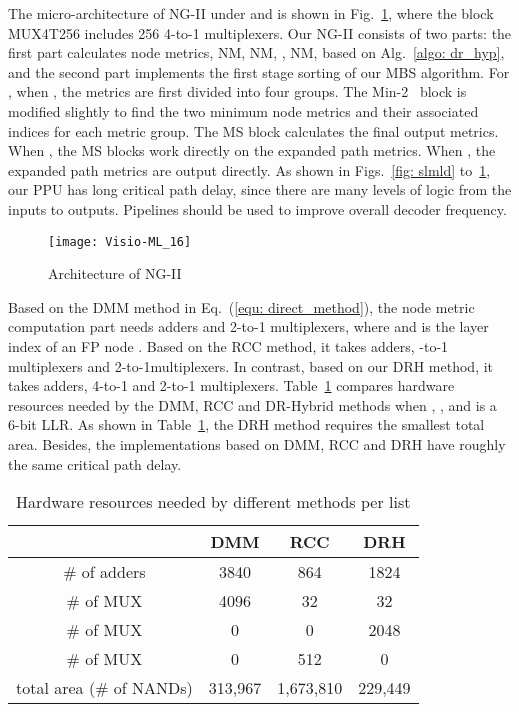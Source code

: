 \documentclass[journal]{IEEEtran}
\begin{document}
The micro-architecture of NG-II under  and  is shown in Fig.~\ref{fig:ML16}, where the block MUX4T256 includes 256 4-to-1 multiplexers. Our NG-II consists of two parts: the first part calculates  node metrics, NM, NM, , NM, based on Alg.~\ref{algo: dr_hyp}, and the second part implements the first stage sorting of our MBS algorithm. For , when , the  metrics are first divided into four groups. The Min-2~\cite{min2} block is modified slightly to find the two minimum node metrics and their associated indices for each metric group. The MS block calculates the final output metrics. When , the MS blocks work directly on the  expanded path metrics. When , the expanded path metrics are output directly. As shown in Figs.~\ref{fig: slmld} to~\ref{fig:ML16}, our PPU has long critical path delay, since there are many levels of logic from the inputs to outputs. Pipelines should be used to improve overall decoder frequency.

\begin{figure}[htbp]
\centering
\texttt{[image: Visio-ML\_16]}
\caption{Architecture of NG-II}\label{fig:ML16}
\end{figure}

Based on the DMM method in Eq.~(\ref{equ: direct_method}), the node metric computation part needs  adders and  2-to-1 multiplexers, where  and  is the layer index of an FP node . Based on the RCC method, it takes  adders,  -to-1 multiplexers and  2-to-1multiplexers.
In contrast, based on our DRH method, it takes  adders,  4-to-1 and  2-to-1 multiplexers. Table~\ref{tab:ML_16} compares hardware resources needed by the DMM, RCC and DR-Hybrid methods when , , and  is a 6-bit LLR. As shown in Table~\ref{tab:ML_16}, the DRH method requires the smallest total area. Besides, the implementations based on DMM, RCC and DRH have roughly the same critical path delay.

\begin{table}[htbp]
\begin{center}
\caption{Hardware resources needed by different methods per list}
\label{tab:ML_16}
\begin{tabular}{|c|c|c|c|}
\hline
& DMM & RCC & DRH \\ \hline
\# of adders & 3840 & 864 & 1824 \\ \hline
\# of MUX & 4096 & 32 & 32 \\ \hline
\# of MUX & 0 & 0 & 2048 \\ \hline
\# of MUX & 0 & 512 & 0 \\ \hline
total area (\# of NANDs) & 313,967 & 1,673,810 & 229,449 \\ \hline
\end{tabular}
\end{center}
\end{table}
\end{document}
